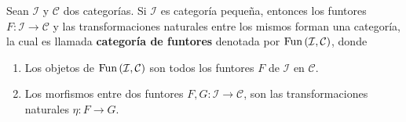 \documentclass[12pt]{report}
\theoremstyle{largebreak}
\newcommand\cf[3]{\ensuremath{#1:#2\rightarrow#3}}
\newcommand{\Fun}[2]{\ensuremath{\textup{Fun}\left(#1,#2\right)}}
\begin{document}
    \begin{propo}
        Sean $\mathcal{I}$ y $\mathcal{C}$ dos categorías. Si $\mathcal{I}$ es categoría pequeña, entonces los funtores $\cf{F}{\mathcal{I}}{\mathcal{C}}$ y las transformaciones naturales entre los mismos forman una categoría, la cual es llamada \textbf{categoría de funtores} denotada por $\Fun{\mathcal{I}}{\mathcal{C}}$, donde
        \begin{enumerate}
            \item Los objetos de $\Fun{\mathcal{I}}{\mathcal{C}}$ son todos los funtores $F$ de $\mathcal{I}$ en $\mathcal{C}$.
            \item Los morfismos entre dos funtores $\cf{F,G}{\mathcal{I}}{\mathcal{C}}$, son las transformaciones naturales $\cf{\eta}{F}{G}$.
        \end{enumerate}
    \end{propo}
\end{document}

